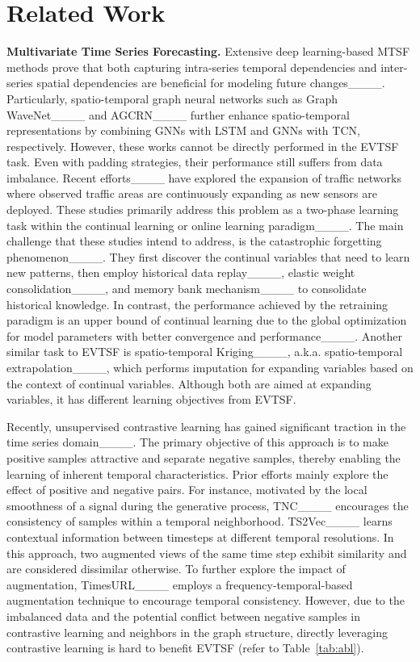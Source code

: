 \section{Related Work}
\textbf{Multivariate Time Series Forecasting.} Extensive deep learning-based MTSF methods prove that both capturing intra-series temporal dependencies and inter-series spatial dependencies are beneficial for modeling future changes____. Particularly, spatio-temporal graph neural networks such as Graph WaveNet____ and AGCRN____ further enhance spatio-temporal representations by combining GNNs with LSTM and GNNs with TCN, respectively.
However, these works cannot be directly performed in the EVTSF task. Even with padding strategies, their performance still suffers from data imbalance. Recent efforts____ have explored the expansion of traffic networks where observed traffic areas are continuously expanding as new sensors are deployed. 
These studies primarily address this problem as a two-phase learning task within the continual learning or online learning paradigm____. 
The main challenge that these studies intend to address, is the catastrophic forgetting phenomenon____. They first discover the continual variables that need to learn new patterns, then employ historical data replay____, elastic weight consolidation____, and memory bank mechanism____ to consolidate historical knowledge. In contrast, the performance achieved by the retraining paradigm is an upper bound of continual learning due to the global optimization for model parameters with better convergence and performance____. Another similar task to EVTSF is spatio-temporal Kriging____, a.k.a. spatio-temporal extrapolation____, which performs imputation for expanding variables based on the context of continual variables. Although both are aimed at expanding variables, it has different learning objectives from EVTSF.

 Recently, unsupervised contrastive learning has gained significant traction in the time series domain____. The primary objective of this approach is to make positive samples attractive and separate negative samples, thereby enabling the learning of inherent temporal characteristics. Prior efforts mainly explore the effect of positive and negative pairs. For instance, motivated by the local smoothness of a signal during the generative process, TNC____ encourages the consistency of samples within a temporal neighborhood. TS2Vec____ learns contextual information between timesteps at different temporal resolutions. In this approach, two augmented views of the same time step exhibit similarity and are considered dissimilar otherwise. To further explore the impact of augmentation, TimesURL____ employs a frequency-temporal-based augmentation technique to encourage temporal consistency. However, due to the imbalanced data and the potential conflict between negative samples in contrastive learning and neighbors in the graph structure, directly leveraging contrastive learning is hard to benefit EVTSF (refer to Table~\ref{tab:abl}).
